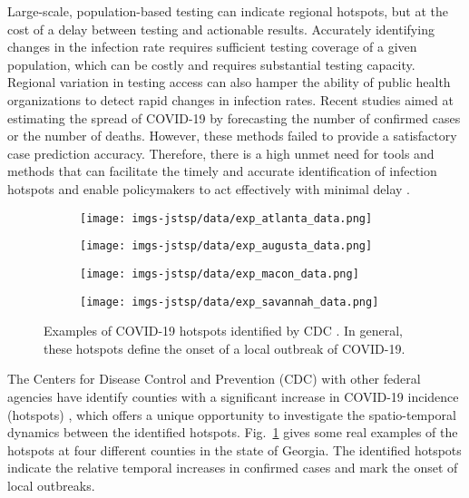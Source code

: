 \documentclass[journal]{IEEEtran}
\begin{document}
Large-scale, population-based testing can indicate regional hotspots, but at the cost of a delay between testing and actionable results. 
Accurately identifying changes in the infection rate requires sufficient testing coverage of a given population, which can be costly and requires substantial testing capacity.
Regional variation in testing access can also hamper the ability of public health organizations to detect rapid changes in infection rates.
Recent studies \cite{CDC} aimed at estimating the spread of COVID-19 by forecasting the number of confirmed cases or the number of deaths. 
However, these methods failed to provide a satisfactory case prediction accuracy.
Therefore, there is a high unmet need for tools and methods that can facilitate the timely and accurate identification of infection hotspots and enable policymakers to act effectively with minimal delay \cite{rossman2020framework}.

\begin{figure}[!t]
\centering
\begin{subfigure}[h]{0.49\linewidth}
\texttt{[image: imgs-jstsp/data/exp\_atlanta\_data.png]}
\end{subfigure}
\begin{subfigure}[h]{0.49\linewidth}
\texttt{[image: imgs-jstsp/data/exp\_augusta\_data.png]}
\end{subfigure}
\begin{subfigure}[h]{0.49\linewidth}
\texttt{[image: imgs-jstsp/data/exp\_macon\_data.png]}
\end{subfigure}
\begin{subfigure}[h]{0.49\linewidth}
\texttt{[image: imgs-jstsp/data/exp\_savannah\_data.png]}
\end{subfigure}
\caption{Examples of COVID-19 hotspots identified by CDC \cite{oster2020trends}. In general, these hotspots define the onset of a local outbreak of COVID-19.}
\label{fig:illustrative-example}
\end{figure}

The Centers for Disease Control and Prevention (CDC) with other federal agencies have identify counties with a significant increase in COVID-19 incidence (hotspots) \cite{oster2020trends}, which offers a unique opportunity to investigate the spatio-temporal dynamics between the identified hotspots.
Fig.~\ref{fig:illustrative-example} gives some real examples of the hotspots at four different counties in the state of Georgia. 
The identified hotspots indicate the relative temporal increases in confirmed cases and mark the onset of local outbreaks.
\end{document}
